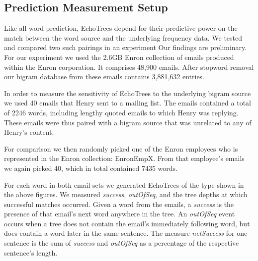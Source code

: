 \documentclass{sigchi}
\newcommand\T{\rule{0pt}{2.5ex}}%
\newcommand\B{\rule[-1ex]{0pt}{0pt}}%
\begin{document}
\subsection{Prediction Measurement Setup}
Like all word prediction, EchoTrees depend for their predictive power
on the match between the word source and the underlying frequency
data. We tested and compared two such pairings in an experiment
Our findings are preliminary. For our experiment we used the 2.6GB
Enron collection of emails produced within the Enron corporation. It
comprises 48,900 emails. After stopword removal our bigram database
from these emails contains 3,881,632 entries.

In order to measure the sensitivity of EchoTrees to the underlying
bigram source we used 40 emails that Henry sent to a mailing list. The
emails contained a total of 2246 words, including lengthy quoted
emails to which Henry was replying. These emails were thus paired with
a bigram source that was unrelated to any of Henry's content.

For comparison we then randomly picked one of the Enron employees
who is represented in the Enron collection: EnronEmpX. From that
employee's emails we again picked 40, which in total contained 7435
words. 

For each word in both email sets we generated EchoTrees of the type
shown in the above figures. We measured {\em success}, {\em outOfSeq},
and the tree depths at which successful matches occurred. Given a word
from the emails, a {\em success} is the presence of that email's next
word anywhere in the tree. An {\em outOfSeq} event occurs when a tree
does not contain the email's immediately following word, but does
contain a word later in the same sentence. The measure {\em
  netSuccess} for one sentence is the sum of {\em success} and {\em
  outOfSeq} as a percentage of the respective sentence's length.
\end{document}
